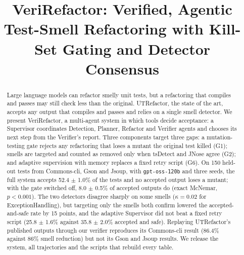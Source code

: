 \documentclass[conference]{IEEEtran}
\begin{document}
\title{VeriRefactor: Verified, Agentic Test-Smell Refactoring with Kill-Set Gating and Detector Consensus}
\author{
}
\maketitle

\begin{abstract}
Large language models can refactor smelly unit tests, but a refactoring that compiles and passes may still check less than the original.
UTRefactor, the state of the art, accepts any output that compiles and passes and relies on a single smell detector.
We present VeriRefactor, a multi-agent system in which tools decide acceptance: a Supervisor coordinates Detection, Planner, Refactor and Verifier agents and chooses its next step from the Verifier's report.
Three components target three gaps: a mutation-testing gate rejects any refactoring that loses a mutant the original test killed (G1); smells are targeted and counted as removed only when tsDetect and JNose agree (G2); and adaptive supervision with memory replaces a fixed retry script (G6).
On 150 held-out tests from Commons-cli, Gson and Jsoup, with \texttt{gpt-oss-120b} and three seeds, the full system accepts 52.4 $\pm$ 1.0\% of the tests and no accepted output loses a mutant; with the gate switched off, 8.0 $\pm$ 0.5\% of accepted outputs do (exact McNemar, $p<0.001$).
The two detectors disagree sharply on some smells ($\kappa=0.02$ for ExceptionHandling), but targeting only the smells both confirm lowered the accepted-and-safe rate by 15 points, and the adaptive Supervisor did not beat a fixed retry script (25.8 $\pm$ 1.6\% against 35.8 $\pm$ 2.0\% accepted and safe).
Replaying UTRefactor's published outputs through our verifier reproduces its Commons-cli result (86.4\% against 86\% smell reduction) but not its Gson and Jsoup results.
We release the system, all trajectories and the scripts that rebuild every table.
\end{abstract}
\end{document}
